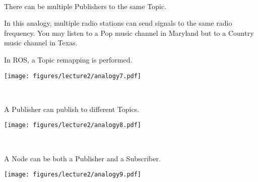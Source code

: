 \documentclass[usenames,11,dvipsnames,svgnames,x11names,aspectratio=1610,bibref]{beamer}
\newcommand{\mydisclaimer}{{\color{disclaimer}{\scriptsize ROS 2 -- Part I}}}
\newcommand{\iconColor}[1]{\textcolor{iconColor}{#1}}
\renewcommand\sec{{\cnordSix{\secname}\hfill\mydisclaimer~} }
\newcommand{\mynote}{\iconColor{\faEdit}\xspace}
\begin{document}
 
\begin{frame}[fragile]{\sec}
\vspace*{\fill}
\begin{center} 
There can be multiple Publishers to the same Topic. 

\begin{compactitem}
\footnotesize

\item In this analogy, multiple radio stations can send signals to the same radio frequency. You may listen to a Pop music channel in Maryland but to a Country music channel in Texas.
\item \mynote In ROS, a Topic remapping is performed.
\end{compactitem}

\texttt{[image: figures/lecture2/analogy7.pdf]}

\end{center}
\vspace*{\fill}
\end{frame}


\begin{frame}[fragile]{\sec}
\vspace*{\fill}
\begin{center} 
A Publisher can publish to different Topics.

\texttt{[image: figures/lecture2/analogy8.pdf]}

\end{center}
\vspace*{\fill}
\end{frame}



\begin{frame}[fragile]{\sec}
\vspace*{\fill}
\begin{center} 
A Node can be both a Publisher and a Subscriber.

\texttt{[image: figures/lecture2/analogy9.pdf]}

\end{center}
\vspace*{\fill}
\end{frame}


\end{document}
